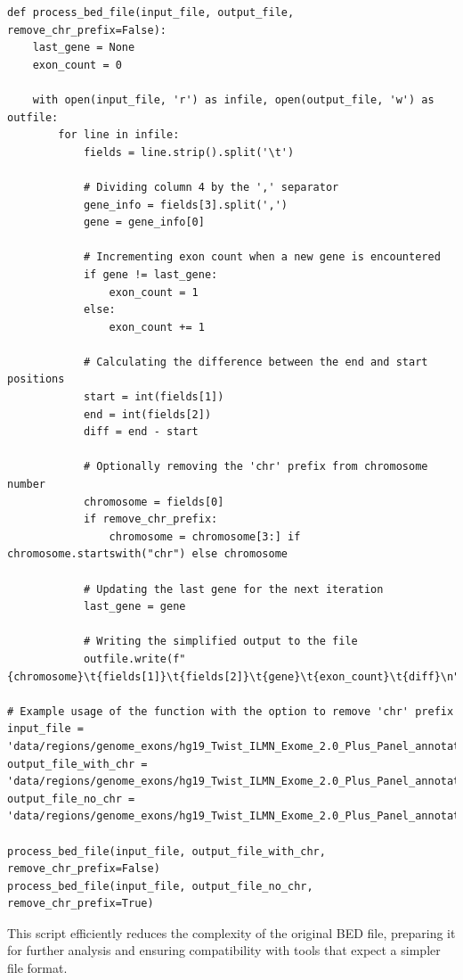 \begin{longlisting}
\begin{verbatim}
def process_bed_file(input_file, output_file, remove_chr_prefix=False):
    last_gene = None
    exon_count = 0
    
    with open(input_file, 'r') as infile, open(output_file, 'w') as outfile:
        for line in infile:
            fields = line.strip().split('\t')
            
            # Dividing column 4 by the ',' separator
            gene_info = fields[3].split(',')
            gene = gene_info[0]
            
            # Incrementing exon count when a new gene is encountered
            if gene != last_gene:
                exon_count = 1
            else:
                exon_count += 1
            
            # Calculating the difference between the end and start positions
            start = int(fields[1])
            end = int(fields[2])
            diff = end - start
            
            # Optionally removing the 'chr' prefix from chromosome number
            chromosome = fields[0]
            if remove_chr_prefix:
                chromosome = chromosome[3:] if chromosome.startswith("chr") else chromosome
            
            # Updating the last gene for the next iteration
            last_gene = gene
            
            # Writing the simplified output to the file
            outfile.write(f"{chromosome}\t{fields[1]}\t{fields[2]}\t{gene}\t{exon_count}\t{diff}\n")

# Example usage of the function with the option to remove 'chr' prefix
input_file = 'data/regions/genome_exons/hg19_Twist_ILMN_Exome_2.0_Plus_Panel_annotated.BED'
output_file_with_chr = 'data/regions/genome_exons/hg19_Twist_ILMN_Exome_2.0_Plus_Panel_annotated_modif.bed'
output_file_no_chr = 'data/regions/genome_exons/hg19_Twist_ILMN_Exome_2.0_Plus_Panel_annotated_modif_nochr.bed'

process_bed_file(input_file, output_file_with_chr, remove_chr_prefix=False)
process_bed_file(input_file, output_file_no_chr, remove_chr_prefix=True)
\end{verbatim}
\end{longlisting}

This script efficiently reduces the complexity of the original BED file, preparing it for further analysis and ensuring compatibility with tools that expect a simpler file format.


